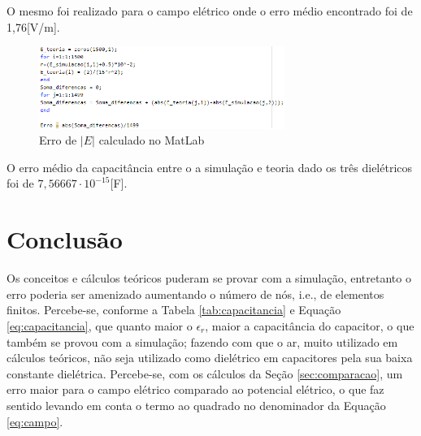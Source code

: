 \documentclass[a4paper]{article}
\begin{document}
\begin{multicols}{2}
	O mesmo foi realizado para o campo elétrico onde o erro médio encontrado foi de 1,76[V/m].
	
	\begin{figure} [H]
		\centering
		\caption{Erro de $ |E| $ calculado no MatLab}
		\includegraphics[width=8cm ,fbox]{latex/matlab1.png}
	\end{figure}

	O erro médio da capacitância entre o a simulação e teoria dado os três dielétricos foi de $7,56667\cdot 10^{-15}$[F].
	
	\section{Conclusão}
	Os conceitos e cálculos teóricos puderam se provar com a simulação, entretanto o erro poderia ser amenizado aumentando o número de nós, i.e., de elementos finitos. Percebe-se, conforme a Tabela \ref{tab:capacitancia} e Equação \ref{eq:capacitancia}, que quanto maior o $\epsilon_{r}$, maior a capacitância do capacitor, o que também se provou com a simulação; fazendo com que o ar, muito utilizado em cálculos teóricos, não seja utilizado como dielétrico em capacitores pela sua baixa constante dielétrica. Percebe-se, com os cálculos da Seção \ref{sec:comparacao}, um erro maior para o campo elétrico comparado ao potencial elétrico, o que faz sentido levando em conta o termo ao quadrado no denominador da Equação \ref{eq:campo}.
	
	
	
	\end{multicols}

\newpage

\end{document}
